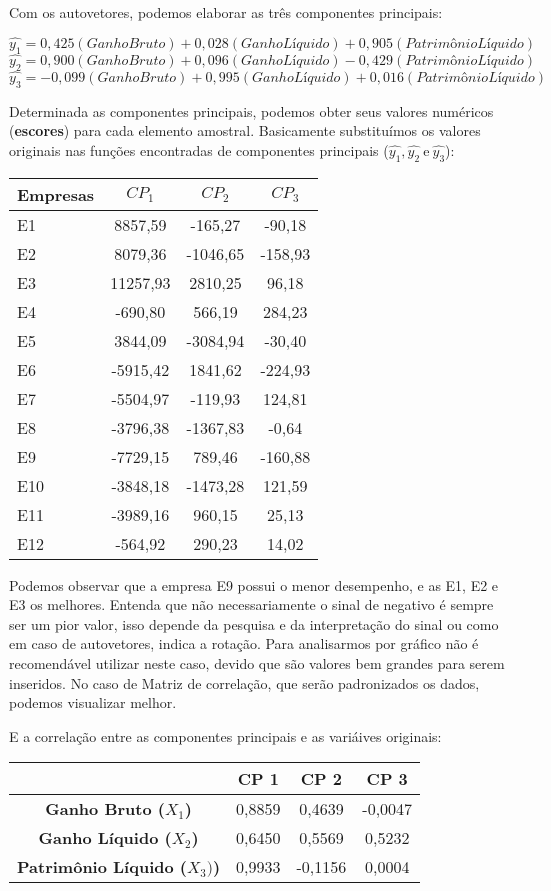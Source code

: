 \documentclass[
  openany]{book}
\begin{document}
Com os autovetores, podemos elaborar as três componentes principais:

\[\hat{y_1}=0,425(Ganho Bruto)+0,028(GanhoLíquido)+0,905(PatrimônioLíquido)\]
\[\hat{y_2}=0,900(Ganho Bruto)+0,096(GanhoLíquido)-0,429(PatrimônioLíquido)\]
\[\hat{y_3}=-0,099(Ganho Bruto)+0,995(GanhoLíquido)+0,016(PatrimônioLíquido)\]

Determinada as componentes principais, podemos obter seus valores numéricos (\textbf{escores}) para cada elemento amostral. Basicamente substituímos os valores originais nas funções encontradas de componentes principais (\(\hat{y_1},\hat{y_2} \ \mbox{e}\  \hat{y_3}\)):

\begin{longtable}[]{@{}lccc@{}}
\toprule
\textbf{Empresas} & \textbf{\(CP_1\)} & \textbf{\(CP_2\)} & \textbf{\(CP_3\)}\tabularnewline
\midrule
\endhead
E1 & 8857,59 & -165,27 & -90,18\tabularnewline
E2 & 8079,36 & -1046,65 & -158,93\tabularnewline
E3 & 11257,93 & 2810,25 & 96,18\tabularnewline
E4 & -690,80 & 566,19 & 284,23\tabularnewline
E5 & 3844,09 & -3084,94 & -30,40\tabularnewline
E6 & -5915,42 & 1841,62 & -224,93\tabularnewline
E7 & -5504,97 & -119,93 & 124,81\tabularnewline
E8 & -3796,38 & -1367,83 & -0,64\tabularnewline
E9 & -7729,15 & 789,46 & -160,88\tabularnewline
E10 & -3848,18 & -1473,28 & 121,59\tabularnewline
E11 & -3989,16 & 960,15 & 25,13\tabularnewline
E12 & -564,92 & 290,23 & 14,02\tabularnewline
\bottomrule
\end{longtable}

Podemos observar que a empresa E9 possui o menor desempenho, e as E1, E2 e E3 os melhores. Entenda que não necessariamente o sinal de negativo é sempre ser um pior valor, isso depende da pesquisa e da interpretação do sinal ou como em caso de autovetores, indica a rotação. Para analisarmos por gráfico não é recomendável utilizar neste caso, devido que são valores bem grandes para serem inseridos. No caso de Matriz de correlação, que serão padronizados os dados, podemos visualizar melhor.

E a correlação entre as componentes principais e as variáives originais:

\begin{longtable}[]{@{}cccc@{}}
\toprule
& \textbf{CP 1} & \textbf{CP 2} & \textbf{CP 3}\tabularnewline
\midrule
\endhead
\textbf{Ganho Bruto (\(X_1\))} & 0,8859 & 0,4639 & -0,0047\tabularnewline
\textbf{Ganho Líquido (\(X_2\))} & 0,6450 & 0,5569 & 0,5232\tabularnewline
\textbf{Patrimônio Líquido (\(X_3)\))} & 0,9933 & -0,1156 & 0,0004\tabularnewline
\bottomrule
\end{longtable}
\end{document}
